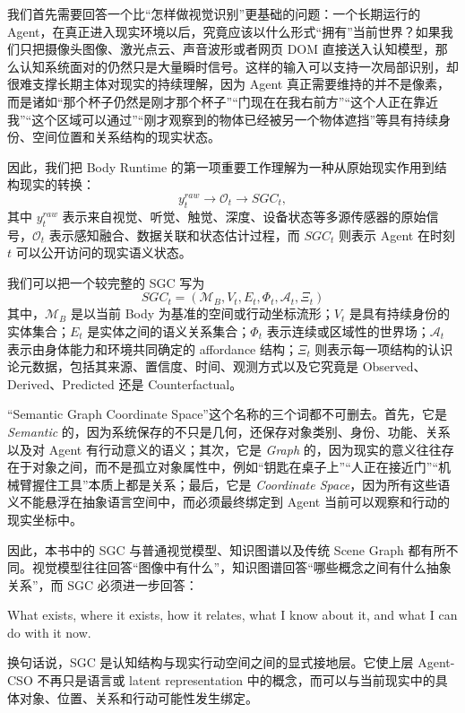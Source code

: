 我们首先需要回答一个比“怎样做视觉识别”更基础的问题：一个长期运行的 Agent，在真正进入现实环境以后，究竟应该以什么形式“拥有”当前世界？如果我们只把摄像头图像、激光点云、声音波形或者网页 DOM 直接送入认知模型，那么认知系统面对的仍然只是大量瞬时信号。这样的输入可以支持一次局部识别，却很难支撑长期主体对现实的持续理解，因为 Agent 真正需要维持的并不是像素，而是诸如“那个杯子仍然是刚才那个杯子”“门现在在我右前方”“这个人正在靠近我”“这个区域可以通过”“刚才观察到的物体已经被另一个物体遮挡”等具有持续身份、空间位置和关系结构的现实状态。

因此，我们把 Body Runtime 的第一项重要工作理解为一种从原始现实作用到结构现实的转换：
\[
y_t^{raw}
\longrightarrow
\mathcal O_t
\longrightarrow
SGC_t ,
\]
其中 $y_t^{raw}$ 表示来自视觉、听觉、触觉、深度、设备状态等多源传感器的原始信号，$\mathcal O_t$ 表示感知融合、数据关联和状态估计过程，而 $SGC_t$ 则表示 Agent 在时刻 $t$ 可以公开访问的现实语义状态。

我们可以把一个较完整的 SGC 写为
\[
\boxed{
SGC_t=
\left(
\mathcal M_B,
V_t,
E_t,
\Phi_t,
\mathcal A_t,
\Xi_t
\right)
}
\]
其中，$\mathcal M_B$ 是以当前 Body 为基准的空间或行动坐标流形；$V_t$ 是具有持续身份的实体集合；$E_t$ 是实体之间的语义关系集合；$\Phi_t$ 表示连续或区域性的世界场；$\mathcal A_t$ 表示由身体能力和环境共同确定的 affordance 结构；$\Xi_t$ 则表示每一项结构的认识论元数据，包括其来源、置信度、时间、观测方式以及它究竟是 Observed、Derived、Predicted 还是 Counterfactual。

“Semantic Graph Coordinate Space”这个名称的三个词都不可删去。首先，它是 \emph{Semantic} 的，因为系统保存的不只是几何，还保存对象类别、身份、功能、关系以及对 Agent 有行动意义的语义；其次，它是 \emph{Graph} 的，因为现实的意义往往存在于对象之间，而不是孤立对象属性中，例如“钥匙在桌子上”“人正在接近门”“机械臂握住工具”本质上都是关系；最后，它是 \emph{Coordinate Space}，因为所有这些语义不能悬浮在抽象语言空间中，而必须最终绑定到 Agent 当前可以观察和行动的现实坐标中。

因此，本书中的 SGC 与普通视觉模型、知识图谱以及传统 Scene Graph 都有所不同。视觉模型往往回答“图像中有什么”，知识图谱回答“哪些概念之间有什么抽象关系”，而 SGC 必须进一步回答：
\begin{statementbox}
What exists, where it exists, how it relates, what I know about it,
and what I can do with it now.
\end{statementbox}
换句话说，SGC 是认知结构与现实行动空间之间的显式接地层。它使上层 Agent-CSO 不再只是语言或 latent representation 中的概念，而可以与当前现实中的具体对象、位置、关系和行动可能性发生绑定。

